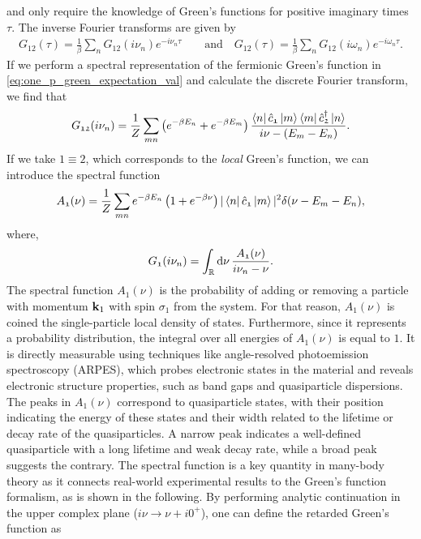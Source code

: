 \documentclass[../../main.tex]{subfiles}
\begin{document}
and only require the knowledge of Green's functions for positive imaginary times $\tau$. The inverse Fourier transforms are given by
\begin{align}
	G_{\mathfrak{12}}(\tau)=\frac1\beta \sum_n G_{\mathfrak{12}}(i\nu_n) e^{-i\nu_n\tau} \qquad\text{and}\quad G_{\mathfrak{12}}(\tau)=\frac1\beta \sum_n G_{\mathfrak{12}}(i\omega_n) e^{-i\omega_n\tau}.
\end{align}
If we perform a spectral representation of the fermionic Green's function in \eqref{eq:one_p_green_expectation_val} and calculate the discrete Fourier transform, we find that
\begin{align}
	G_{\mathfrak{12}}(i\nu_n)=\frac1Z\sum_{mn}\left (e^{-\beta E_n}+e^{-\beta E_m}\right )\frac{\bra{n} \hat c_{\mathfrak{1}} \ket{m}\bra{m} \hat c^{\dagger}_{\mathfrak{2}} \ket{n}}{i\nu-(E_m-E_n)}.
\end{align}
If we take $\mathfrak{1}\equiv \mathfrak{2}$, which corresponds to the \textit{local} Green's function, we can introduce the spectral function
\begin{align}
	A_{\mathfrak{1}}(\nu)=\frac1Z\sum_{mn} e^{-\beta E_n}\left (1+e^{-\beta\nu}\right ) |\bra{n} \hat c_{\mathfrak{1}} \ket{m}|^2 \delta(\nu-E_m-E_n),
\end{align}
where,
\begin{align}
	G_{\mathfrak{1}}(i\nu_n)=\int_{\mathbb{R}}^{}\text{d}\nu\,\frac{A_{\mathfrak{1}}(\nu)}{i\nu_n-\nu}.
\end{align}
The spectral function $A_{\mathfrak{1}}(\nu)$ is the probability of adding or removing a particle with momentum $\textbf{k}_1$ with spin $\sigma_1$ from the system. For that reason, $A_{\mathfrak{1}}(\nu)$ is coined the single-particle local density of states. Furthermore, since it represents a probability distribution, the integral over all energies of $A_{\mathfrak{1}}(\nu)$ is equal to $1$. It is directly measurable using techniques like angle-resolved photoemission spectroscopy (ARPES), which probes electronic states in the material and reveals electronic structure properties, such as band gaps and quasiparticle dispersions. The peaks in $A_{\mathfrak{1}}(\nu)$ correspond to quasiparticle states, with their position indicating the energy of these states and their width related to the lifetime or decay rate of the quasiparticles. A narrow peak indicates a well-defined quasiparticle with a long lifetime and weak decay rate, while a broad peak suggests the contrary. The spectral function is a key quantity in many-body theory as it connects real-world experimental results to the Green's function formalism, as is shown in the following. By performing analytic continuation in the upper complex plane ($i\nu\to\nu+i0^{+}$), one can define the retarded Green's function as
\end{document}
